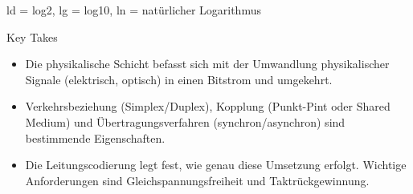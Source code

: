 \begin{remark}
    ld = log2, lg = log10, ln = natürlicher Logarithmus
\end{remark}

\begin{KR}{Key Takes}
    \begin{itemize}
        \item Die physikalische Schicht befasst sich mit der Umwandlung physikalischer Signale (elektrisch, optisch) in einen Bitstrom und umgekehrt.
        \item Verkehrsbeziehung (Simplex/Duplex), Kopplung (Punkt-Pint oder Shared Medium) und Übertragungsverfahren (synchron/asynchron) sind bestimmende Eigenschaften.
        \item Die Leitungscodierung legt fest, wie genau diese Umsetzung erfolgt. Wichtige Anforderungen sind Gleichspannungsfreiheit und Taktrückgewinnung.
    \end{itemize}
\end{KR}
